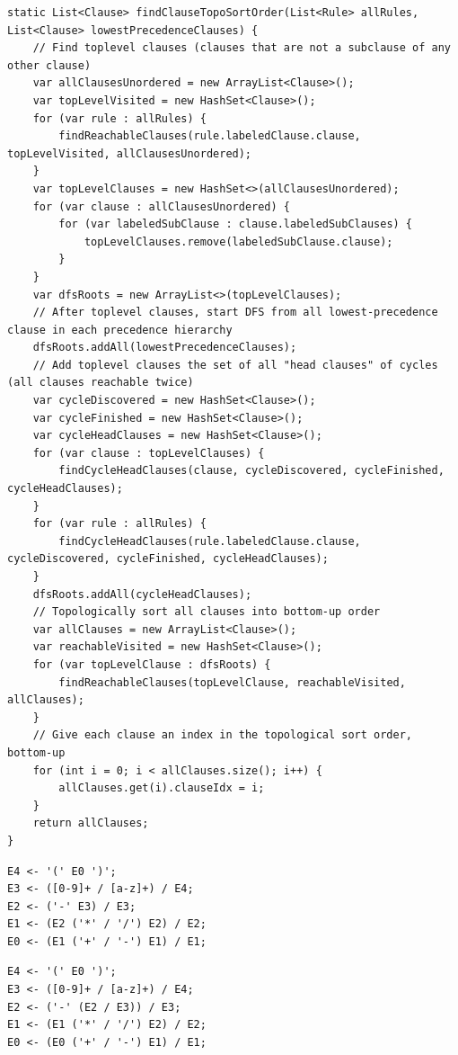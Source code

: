 \documentclass[manuscript,screen]{acmart}
\begin{document}
\begin{lstlisting}[caption={Algorithm for topologically sorting clauses into bottom-up order},label={lst:topoSort}]
static List<Clause> findClauseTopoSortOrder(List<Rule> allRules, List<Clause> lowestPrecedenceClauses) {
    // Find toplevel clauses (clauses that are not a subclause of any other clause)
    var allClausesUnordered = new ArrayList<Clause>();
    var topLevelVisited = new HashSet<Clause>();
    for (var rule : allRules) {
        findReachableClauses(rule.labeledClause.clause, topLevelVisited, allClausesUnordered);
    }
    var topLevelClauses = new HashSet<>(allClausesUnordered);
    for (var clause : allClausesUnordered) {
        for (var labeledSubClause : clause.labeledSubClauses) {
            topLevelClauses.remove(labeledSubClause.clause);
        }
    }
    var dfsRoots = new ArrayList<>(topLevelClauses);
    // After toplevel clauses, start DFS from all lowest-precedence clause in each precedence hierarchy
    dfsRoots.addAll(lowestPrecedenceClauses);
    // Add toplevel clauses the set of all "head clauses" of cycles (all clauses reachable twice)
    var cycleDiscovered = new HashSet<Clause>();
    var cycleFinished = new HashSet<Clause>();
    var cycleHeadClauses = new HashSet<Clause>();
    for (var clause : topLevelClauses) {
        findCycleHeadClauses(clause, cycleDiscovered, cycleFinished, cycleHeadClauses);
    }
    for (var rule : allRules) {
        findCycleHeadClauses(rule.labeledClause.clause, cycleDiscovered, cycleFinished, cycleHeadClauses);
    }
    dfsRoots.addAll(cycleHeadClauses);
    // Topologically sort all clauses into bottom-up order
    var allClauses = new ArrayList<Clause>();
    var reachableVisited = new HashSet<Clause>();
    for (var topLevelClause : dfsRoots) {
        findReachableClauses(topLevelClause, reachableVisited, allClauses);
    }
    // Give each clause an index in the topological sort order, bottom-up
    for (int i = 0; i < allClauses.size(); i++) {
        allClauses.get(i).clauseIdx = i;
    }
    return allClauses;
}
\end{lstlisting}

\newpage

\begin{lstlisting}[caption={A primitive precedence-climbing grammar},label={lst:grammarIncomplete}]
E4 <- '(' E0 ')';
E3 <- ([0-9]+ / [a-z]+) / E4;
E2 <- ('-' E3) / E3;
E1 <- (E2 ('*' / '/') E2) / E2;
E0 <- (E1 ('+' / '-') E1) / E1;
\end{lstlisting}

\begin{lstlisting}[caption={Improved precedence-climbing grammar, supporting left associativity and self-nesting of parentheses and unary minus},label={lst:grammarFixed}]
E4 <- '(' E0 ')';
E3 <- ([0-9]+ / [a-z]+) / E4;
E2 <- ('-' (E2 / E3)) / E3;
E1 <- (E1 ('*' / '/') E2) / E2;
E0 <- (E0 ('+' / '-') E1) / E1;
\end{lstlisting}
\end{document}
